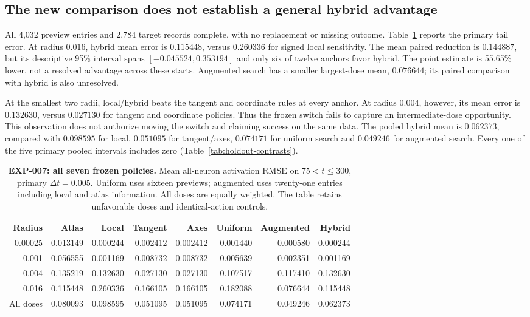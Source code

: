 \subsection{The new comparison does not establish a general hybrid advantage}
All 4,032 preview entries and 2,784 target records complete, with no replacement or missing outcome. Table~\ref{tab:holdout-means} reports the primary tail error. At radius $0.016$, hybrid mean error is $0.115448$, versus $0.260336$ for signed local sensitivity. The mean paired reduction is $0.144887$, but its descriptive 95\% interval spans $[-0.045524,0.353194]$ and only six of twelve anchors favor hybrid. The point estimate is 55.65\% lower, not a resolved advantage across these starts. Augmented search has a smaller largest-dose mean, $0.076644$; its paired comparison with hybrid is also unresolved.

At the smallest two radii, local/hybrid beats the tangent and coordinate rules at every anchor. At radius $0.004$, however, its mean error is $0.132630$, versus $0.027130$ for tangent and coordinate policies. Thus the frozen switch fails to capture an intermediate-dose opportunity. This observation does not authorize moving the switch and claiming success on the same data. The pooled hybrid mean is $0.062373$, compared with $0.098595$ for local, $0.051095$ for tangent/axes, $0.074171$ for uniform search and $0.049246$ for augmented search. Every one of the five primary pooled intervals includes zero (Table~\ref{tab:holdout-contrasts}).

\begin{table}[H]
\centering\small
\setlength{\tabcolsep}{4pt}
\begin{tabular}{rrrrrrrr}
\toprule
Radius & Atlas & Local & Tangent & Axes & Uniform & Augmented & Hybrid\\
\midrule
0.00025 & 0.013149 & 0.000244 & 0.002412 & 0.002412 & 0.001440 & 0.000580 & 0.000244\\
0.001 & 0.056555 & 0.001169 & 0.008732 & 0.008732 & 0.005639 & 0.002351 & 0.001169\\
0.004 & 0.135219 & 0.132630 & 0.027130 & 0.027130 & 0.107517 & 0.117410 & 0.132630\\
0.016 & 0.115448 & 0.260336 & 0.166105 & 0.166105 & 0.182088 & 0.076644 & 0.115448\\
All doses & 0.080093 & 0.098595 & 0.051095 & 0.051095 & 0.074171 & 0.049246 & 0.062373\\
\bottomrule
\end{tabular}
\caption{\textbf{EXP-007: all seven frozen policies.} Mean all-neuron activation RMSE on $75<t\le300$, primary $\Delta t=0.005$. Uniform uses sixteen previews; augmented uses twenty-one entries including local and atlas information. All doses are equally weighted. The table retains unfavorable doses and identical-action controls.}
\label{tab:holdout-means}
\end{table}

